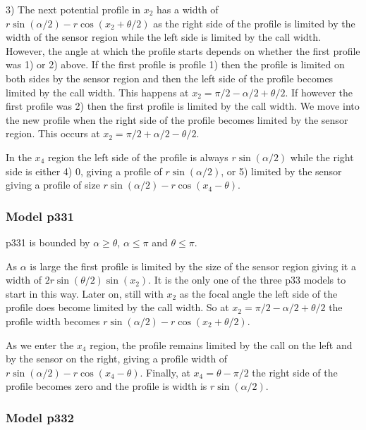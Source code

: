 3) The next potential profile in $x_2$ has a width of $r\sin(\alpha/2) - r\cos(x_2 + \theta/2)$ as the right side of the profile is limited by the width of the sensor region while the left side is limited by the call width. However, the angle at which the profile starts depends on whether the first profile was 1) or 2) above. If the first profile is profile 1) then the profile is limited on both sides by the sensor region and then the left side of the profile becomes limited by the call width. This happens at $x_2 = \pi/2 - \alpha/2 + \theta/2$. If however the first profile was 2) then the first profile is limited by the call width. We move into the new profile when the right side of the profile becomes limited by the sensor region. This occurs at $x_2 = \pi/2 + \alpha/2 - \theta/2$.


In the $x_4$ region the left side of the profile is always $r\sin(\alpha /2)$ while the right side is either 4) 0, giving a profile of $r\sin(\alpha /2)$, or 5) limited by the sensor giving a profile of size $r\sin (\alpha /2) -r\cos(x_4-\theta) $.

\subsubsection{Model p331} \label{p331}

p331 is bounded by $\alpha \ge \theta$, $\alpha \le\pi$ and $\theta \le \pi$.

As $\alpha $ is large the first profile is limited by the size of the sensor region giving it a width of $2r\sin\left(\theta/2\right)\sin(x_2)$. It is the only one of the three p33 models to start in this way. Later on, still with $x_2$ as the focal angle the left side of the profile does become limited by the call width. So at $x_2= \pi/2 - \alpha/2 + \theta/2$ the profile width becomes $r\sin(\alpha/2) - r\cos(x_2 + \theta/2)$. 

As we enter the $x_4$ region, the profile remains limited by the call on the left and by the sensor on the right, giving a profile width of  $r\sin (\alpha /2) -r\cos(x_4-\theta) $. Finally, at $x_4 = \theta - \pi/2$ the right side of the profile becomes zero and the profile is width is $r\sin(\alpha /2)$.



\subsubsection{Model p332} \label{p332}

